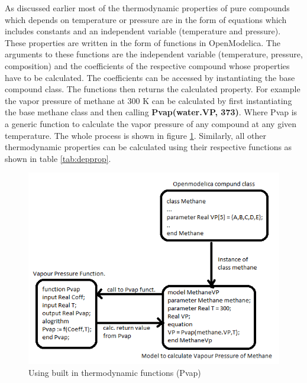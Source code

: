 \documentclass[12pt]{report}
\begin{document}
As discussed earlier most of the thermodynamic properties of pure compounds which depends on temperature or pressure are in the form of equations which includes constants and an independent variable (temperature and pressure). These properties are written in the form of functions in OpenModelica. The arguments to these functions are the independent variable (temperature, pressure, composition) and the coefficients of the respective compound whose properties have to be calculated. The coefficients can be accessed by instantiating the base compound class. The functions then returns the calculated property. For example the vapor pressure of methane at 300 K can be calculated by first instantiating the base methane class and then calling \textbf{Pvap(water.VP, 373)}. Where Pvap is a generic function to calculate the vapor pressure of any compound at any given temperature. The whole process is shown in figure \ref{fig:BT2}. Similarly, all other thermodynamic properties can be calculated using their respective functions as shown in table \ref{tab:depprop}.

\begin{figure}
\centering
\includegraphics[width=0.8\linewidth]{BT2}
\caption{Using built in thermodynamic functions (Pvap)}
\label{fig:BT2}
\end{figure}
\end{document}
